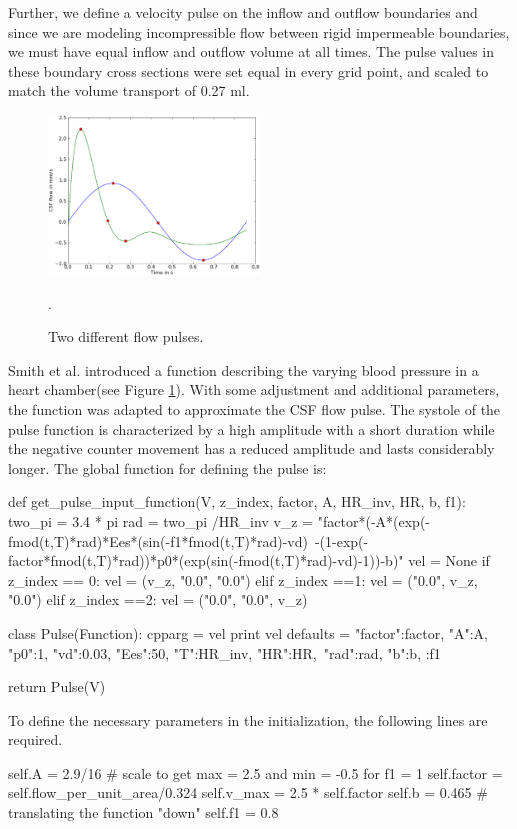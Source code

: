 Further, we define a velocity pulse on the inflow and outflow boundaries and since we are modeling incompressible flow between rigid impermeable boundaries, we must have equal inflow and outflow volume at all times. The pulse values in these boundary cross sections were set equal in every grid point, and scaled to match the volume transport of 0.27 ml. 

\begin{figure}\begin{center}
\includegraphics[width = 0.5\textwidth]{chapters/haughton/eps/sin_pulse.eps}
\caption{Two different flow pulses.}
\label{fig:sin_pulse}. 
\end{center}\end{figure}

Smith et al. \cite{Smith2006} introduced a function describing the varying blood pressure in a heart chamber(see Figure \ref{fig:sin_pulse}). With some adjustment and additional parameters, the function was adapted to approximate the CSF flow pulse. The systole of the pulse function is characterized by a high amplitude with a short duration while the negative counter movement has a reduced amplitude and lasts considerably longer. 
The global function for defining the pulse is:
\begin{code}
def get_pulse_input_function(V, z_index, factor, A, HR_inv, HR, b, f1):
	two_pi = 3.4 * pi
	rad = two_pi /HR_inv	
	v_z = "factor*(-A*(exp(-fmod(t,T)*rad)*Ees*(sin(-f1*fmod(t,T)*rad)-vd)\
          -(1-exp(-factor*fmod(t,T)*rad))*p0*(exp(sin(-fmod(t,T)*rad)-vd)-1))-b)"
	vel = None
	if z_index == 0:
		vel = (v_z, "0.0", "0.0")
	elif z_index ==1:
		vel = ("0.0", v_z, "0.0")
	elif z_index ==2:
		vel = ("0.0", "0.0", v_z)

	class Pulse(Function):
		cpparg = vel
		print vel
		defaults = {"factor":factor, "A":A, "p0":1, "vd":0.03, "Ees":50, "T":HR_inv, "HR":HR,\
                     "rad":rad, "b":b, :f1}

	return Pulse(V)
\end{code}
To define the necessary parameters in the initialization, the following lines are required.
\begin{code}
self.A = 2.9/16	# scale to get max = 2.5 and min = -0.5 for f1 = 1
self.factor = self.flow_per_unit_area/0.324		
self.v_max = 2.5 * self.factor
self.b = 0.465 	# translating the function "down"
self.f1 = 0.8
\end{code}


